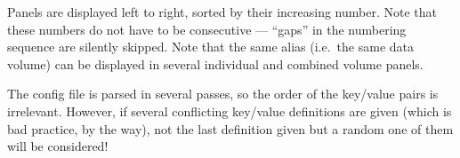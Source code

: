 Panels are displayed left to right, sorted by their increasing number.
Note that these numbers do not have to be consecutive --- ``gaps'' in
the numbering sequence are silently skipped.  Note that the same alias
(i.e.\ the same data volume) can be displayed in several individual
and combined volume panels.

The config file is parsed in several passes, so the order of the
key/value pairs is irrelevant. However, if several conflicting
key/value definitions are given (which is bad practice, by the way),
not the last definition given but a random one of them will be
considered!


